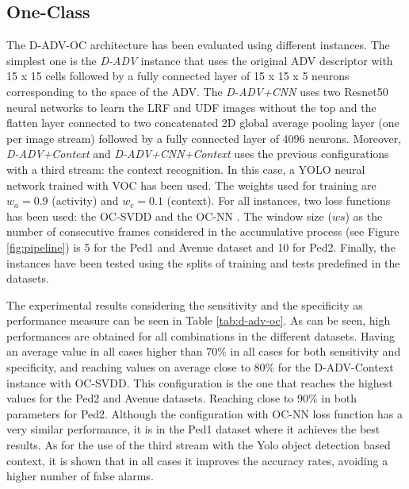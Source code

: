 \subsection{One-Class}\label{sec:exp:oc}
The D-ADV-OC architecture has been evaluated using different instances. The simplest one is the \textit{D-ADV} instance that uses the original ADV descriptor \cite{azorin2014} with 15 x 15 cells followed by a fully connected layer of 15 x 15 x 5 neurons corresponding to the space of the ADV. The \textit{D-ADV+CNN} uses two Resnet50 neural networks to learn the LRF and UDF images without the top and the flatten layer connected to two concatenated 2D global average pooling layer (one per image stream) followed by a fully connected layer of 4096 neurons. Moreover, \textit{D-ADV+Context} and \textit{D-ADV+CNN+Context} uses the previous configurations with a third stream: the context recognition. In this case, a YOLO neural network trained with VOC has been used. The weights used for training are $w_a=0.9$ (activity) and $w_c=0.1$ (context). For all instances, two loss functions has been used: the OC-SVDD \cite{ruff2018deep} and the OC-NN \cite{chalapathy2018anomaly}. The window size ($ws$) as the number of consecutive frames considered in the accumulative process (see Figure \ref{fig:pipeline}) is 5 for the Ped1 and Avenue dataset and 10 for Ped2. Finally, the instances have been tested using the splits of training and tests predefined in the datasets.

The experimental results considering the sensitivity and the specificity as performance measure can be seen in Table \ref{tab:d-adv-oc}. As can be seen, high performances are obtained for all combinations in the different datasets. Having an average value in all cases higher than 70\% in all cases for both sensitivity and specificity, and reaching values on average close to 80\% for the D-ADV-Context instance with OC-SVDD. This configuration is the one that reaches the highest values for the Ped2 and Avenue datasets. Reaching close to 90\% in both parameters for Ped2. Although the configuration with OC-NN loss function has a very similar performance, it is in the Ped1 dataset where it achieves the best results. As for the use of the third stream with the Yolo object detection based context, it is shown that in all cases it improves the accuracy rates, avoiding a higher number of false alarms.

